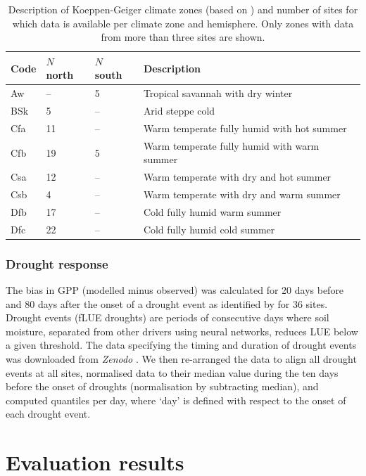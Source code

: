 \documentclass{myreport}
\begin{document}
\begin{table}
\caption{Description of Koeppen-Geiger climate zones (based on \citet{falge17}) and number of sites for which data is available per climate zone and hemisphere. Only zones with data from more than three sites are shown.} 
\centering
\begin{tabular}{llll}
  \toprule
  Code & $N$ north & $N$ south & Description \\ 
  \midrule
   Aw   & -- & 5 &  Tropical savannah with dry winter \\ 
   BSk  & 5 & -- & Arid steppe cold \\ 
   Cfa  & 11 & -- & Warm temperate fully humid with hot summer \\ 
   Cfb  & 19 & 5 & Warm temperate fully humid with warm summer \\ 
   Csa  & 12 & -- & Warm temperate with dry and hot summer \\ 
   Csb  & 4 & -- & Warm temperate with dry and warm summer \\ 
   Dfb  & 17 & -- & Cold fully humid warm summer \\ 
   Dfc  & 22 & -- & Cold fully humid cold summer \\ 
   \bottomrule
  \end{tabular}
  \label{tab:kgclimate}
\end{table}


\subsubsection{Drought response}
\label{sec:droughtresponse}
The bias in GPP (modelled minus observed) was calculated for 20 days before and 80 days after the onset of a drought event as identified by \citet{stocker18newphyt} for 36 sites. Drought events (fLUE droughts) are periods of consecutive days where soil moisture, separated from other drivers using neural networks, reduces LUE below a given threshold. The data specifying the timing and duration of drought events was downloaded from \textit{Zenodo} \citep{flue}. We then re-arranged the data to align all drought events at all sites, normalised data to their median value during the ten days before the onset of droughts (normalisation by subtracting median), and computed quantiles per day, where `day' is defined with respect to the onset of each drought event.



\section{Evaluation results}
\label{sec:results}
\end{document}
